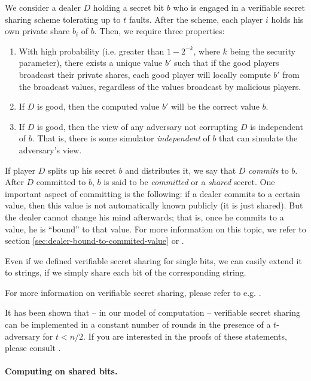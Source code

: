 We consider a dealer $D$ holding a secret bit $b$ who is engaged in a verifiable secret sharing scheme tolerating up to $t$ faults. After the scheme, each player $i$ holds his own private share $b_i$ of $b$. Then, we require three properties:

\begin{enumerate}
\item With high probability (i.e. greater than $1-2^{-k}$, where $k$ being the security parameter), there exists a unique value $b'$ such that if the good players broadcast their private shares, each good player will locally compute $b'$ from the broadcast values, regardless of the values broadcast by malicious players.
\item If $D$ is good, then the computed value $b'$ will be the correct value $b$.
\item If $D$ is good, then the view of any adversary not corrupting $D$ is independent of $b$. That is, there is some simulator \emph{independent} of $b$ that can simulate the adversary's view.
\end{enumerate}

If player $D$ splits up his secret $b$ and distributes it, we say that $D$ \emph{commits} to $b$. After $D$ committed to $b$, $b$ is said to be \emph{committed} or a \emph{shared} secret. One important aspect of committing is the following: if a dealer commits to a certain value, then this value is not automatically known publicly (it is just shared). But the dealer cannot change his mind afterwards; that is, once he commits to a value, he is ``bound'' to that value. For more information on this topic, we refer to section \ref{sec:dealer-bound-to-commited-value} or \cite{lecture-notes-goldwasser-bellare}.

Even if we defined verifiable secret sharing for single bits, we can easily extend it to strings, if we simply share each bit of the corresponding string.

For more information on verifiable secret sharing, please refer to e.g. \cite{verifiable-secret-sharing-chor-ben-gold-sha-mic}.

It has been shown that -- in our model of computation -- verifiable secret sharing can be implemented in a constant number of rounds in the presence of a $t$-adversary for $t<n/2$. If you are interested in the proofs of these statements, please consult \cite{rabin-ben-or-verifiable-secret-sharing-number-rounds,beaver-verifiable-secret-sharing}. 

\paragraph{Computing on shared bits.}

